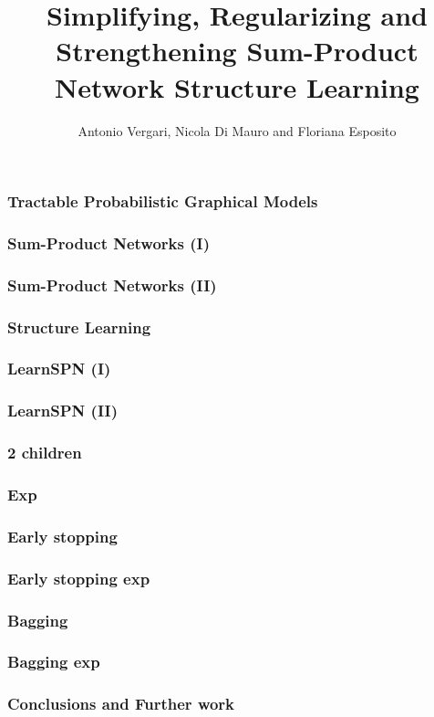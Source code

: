 \documentclass[xcolor={usenames,dvipsnames,svgnames}, compress]{beamer}
\begin{document}
\title{Simplifying, Regularizing and Strengthening Sum-Product Network Structure Learning}
\author{Antonio  Vergari, Nicola  {Di Mauro} and Floriana Esposito}


{
  \begin{frame}
    \titlepage
  \end{frame}
}

\begin{frame}
  \frametitle{Tractable Probabilistic Graphical Models}
\end{frame}

\begin{frame}
  \frametitle{Sum-Product Networks (I)}
\end{frame}

\begin{frame}
  \frametitle{Sum-Product Networks (II)}
\end{frame}

\begin{frame}
  \frametitle{Structure Learning}
\end{frame}

\begin{frame}
  \frametitle{LearnSPN (I)}
\end{frame}

\begin{frame}
  \frametitle{LearnSPN (II)}
\end{frame}

\begin{frame}
  \frametitle{2 children}
\end{frame}

\begin{frame}
  \frametitle{Exp}
\end{frame}

\begin{frame}
  \frametitle{Early stopping}
\end{frame}

\begin{frame}
  \frametitle{Early stopping exp}
\end{frame}

\begin{frame}
  \frametitle{Bagging}
\end{frame}

\begin{frame}
  \frametitle{Bagging exp}
\end{frame}

\begin{frame}
  \frametitle{Conclusions and Further work}
\end{frame}
\end{document}
